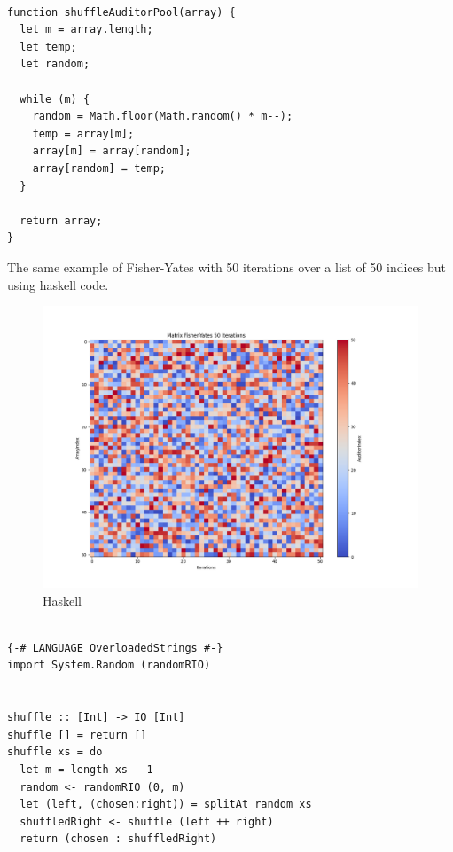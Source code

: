 \documentclass[9pt]{article}
\begin{document}
\begin{tcolorbox}[title=Javascript Code]
\begin{verbatim}

function shuffleAuditorPool(array) { 
  let m = array.length;
  let temp;
  let random;

  while (m) {
    random = Math.floor(Math.random() * m--);
    temp = array[m];
    array[m] = array[random];
    array[random] = temp;
  }
  
  return array;
}
\end{verbatim}
\end{tcolorbox}

The same example of Fisher-Yates with 50 iterations over a list of 50 indices but using haskell code.

\begin{figure}[ht]
  \centering
  \includegraphics[width=1\textwidth]{haskell-matrix.png}
  \caption{Haskell
  }
  \label{fig:haskell-matrix}
\end{figure}


\begin{tcolorbox}[title=Haskell Code]
\begin{verbatim}

{-# LANGUAGE OverloadedStrings #-}
import System.Random (randomRIO)


shuffle :: [Int] -> IO [Int]
shuffle [] = return []
shuffle xs = do
  let m = length xs - 1
  random <- randomRIO (0, m)
  let (left, (chosen:right)) = splitAt random xs
  shuffledRight <- shuffle (left ++ right)
  return (chosen : shuffledRight)


\end{verbatim}
\end{tcolorbox}
\end{document}

